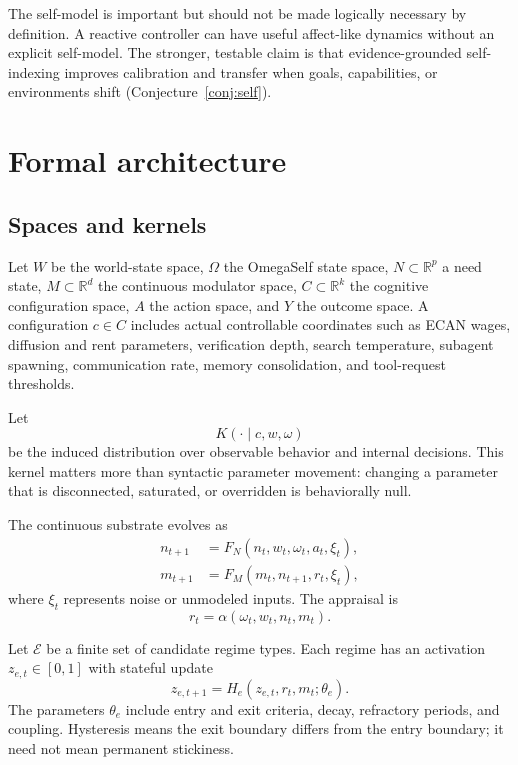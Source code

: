 \documentclass[11pt]{article}
\newcommand{\R}{\mathbb{R}}
\begin{document}
The self-model is important but should not be made logically necessary by
definition.  A reactive controller can have useful affect-like dynamics without
an explicit self-model.  The stronger, testable claim is that evidence-grounded
self-indexing improves calibration and transfer when goals, capabilities, or
environments shift (Conjecture~\ref{conj:self}).

\section{Formal architecture}

\subsection{Spaces and kernels}

Let $W$ be the world-state space, $\Omega$ the OmegaSelf state space, $N\subset
\R^p$ a need state, $M\subset\R^d$ the continuous modulator space, $C\subset
\R^k$ the cognitive configuration space, $A$ the action space, and $Y$ the
outcome space.  A configuration $c\in C$ includes actual controllable coordinates
such as ECAN wages, diffusion and rent parameters, verification depth, search
temperature, subagent spawning, communication rate, memory consolidation, and
tool-request thresholds.

Let
\begin{equation}
K(\cdot\mid c,w,\omega)
\end{equation}
be the induced distribution over observable behavior and internal decisions.
This kernel matters more than syntactic parameter movement: changing a parameter
that is disconnected, saturated, or overridden is behaviorally null.

The continuous substrate evolves as
\begin{align}
n_{t+1} &= F_N(n_t,w_t,\omega_t,a_t,\xi_t),\\
m_{t+1} &= F_M(m_t,n_{t+1},r_t,\xi_t),
\end{align}
where $\xi_t$ represents noise or unmodeled inputs.  The appraisal is
\begin{equation}
r_t=\alpha(\omega_t,w_t,n_t,m_t).
\end{equation}

Let $\mathcal{E}$ be a finite set of candidate regime types.  Each regime has an
activation $z_{e,t}\in[0,1]$ with stateful update
\begin{equation}
z_{e,t+1}=H_e(z_{e,t},r_t,m_t;\theta_e).
\end{equation}
The parameters $\theta_e$ include entry and exit criteria, decay, refractory
periods, and coupling.  Hysteresis means the exit boundary differs from the
entry boundary; it need not mean permanent stickiness.
\end{document}
